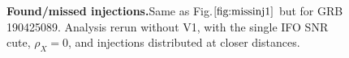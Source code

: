 \documentclass[binding=0.6cm, LaM]{sapthesis}
\begin{document}
                \begin{figure}[h]
                        \noindent
                        \label{missinj3_5}
                        \centering
                        \caption{\textbf{Found/missed injections.}Same as Fig.$\ref{fig:missinj1}$ but for GRB 190425089. Analysis rerun without V1, with the single IFO SNR cute, $\rho_X=0$, and injections distributed at closer distances.}

                        \label{fig:missinj3_5}
                \end{figure}
\end{document}
